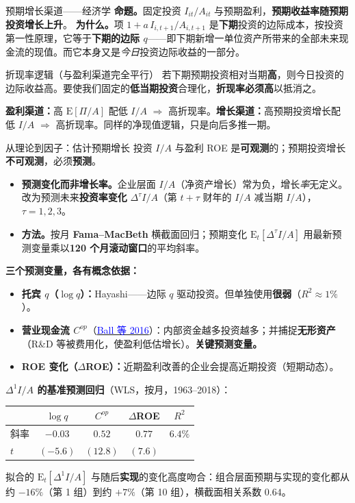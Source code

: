 \documentclass{beamer}
\begin{document}
\begin{frame}{预期增长渠道——经济学}
	\textbf{命题。}固定投资 $I_{it}/A_{it}$ 与预期盈利，\textbf{预期收益率随预期投资增长上升}。
	\vspace{3pt}
	\textbf{为什么。}项 $1+a\,I_{i,t+1}/A_{i,t+1}$ 是\textbf{下期}投资的边际成本，按投资第一性原理，它等于\textbf{下期的边际 $q$}——即下期新增一单位资产所带来的全部未来现金流的现值。而它本身又是\textit{今日}投资边际收益的一部分。
	\begin{block}{折现率逻辑（与盈利渠道完全平行）}
		若下期预期投资相对当期\textbf{高}，则今日投资的边际收益高。要使我们固定的\textbf{低当期投资}合理化，\textbf{折现率必须高}以抵消之。
	\end{block}
	{\footnotesize \textbf{盈利渠道：}高 $\mathrm{E}[\Pi/A]$ 配低 $I/A$ $\Rightarrow$ 高折现率。\quad \textbf{增长渠道：}高预期投资增长配低 $I/A$ $\Rightarrow$ 高折现率。同样的净现值逻辑，只是向后多推一期。}
\end{frame}

\begin{frame}[allowframebreaks]{从理论到因子：估计预期增长}
	投资 $I/A$ 与盈利 ROE 是\textbf{可观测}的；预期投资增长\textbf{不可观测}，必须\textbf{预测}。
	\begin{itemize}
		\item \textbf{预测变化而非增长率。}企业层面 $I/A$（净资产增长）常为负，增长\textit{率}无定义。改为预测未来\textbf{投资率变化} $\Delta^\tau I/A$（第 $t{+}\tau$ 财年的 $I/A$ 减当期 $I/A$），$\tau=1,2,3$。
		\item \textbf{方法。}按月 \textbf{Fama--MacBeth} 横截面回归；预期变化 $\mathrm{E}_t[\Delta^\tau I/A]$ 用最新预测变量乘以\textbf{120 个月滚动窗口}的平均斜率。
	\end{itemize}
	\textbf{三个预测变量，各有概念依据：}
	\begin{itemize}
		\item \textbf{托宾 $q$（$\log q$）：}Hayashi——边际 $q$ 驱动投资。但单独使用\textbf{很弱}（$R^2\approx1\%$）。
		\item \textbf{营业现金流 $C^{op}$}（\href{https://doi.org/10.1016/j.jfineco.2016.03.002}{\textcolor{blue}{Ball 等 2016}}）：内部资金越多投资越多；并捕捉\textbf{无形资产}（R\&D 等被费用化，使盈利低估增长）。\textbf{关键预测变量。}
		\item \textbf{ROE 变化（$\Delta$ROE）：}近期盈利改善的企业会提高近期投资（短期动态）。
	\end{itemize}
	\break
	\textbf{$\Delta^1 I/A$ 的基准预测回归}（WLS，按月，1963--2018）：
	\begin{center}
		\small
		\begin{tabular}{@{}lcccc@{}}
			\toprule
			& $\log q$ & $C^{op}$ & $\Delta$ROE & $R^2$ \\
			\midrule
			斜率 & $-0.03$ & $0.52$ & $0.77$ & $6.4\%$ \\
			$t$  & $(-5.6)$ & $(12.8)$ & $(7.6)$ & \\
			\bottomrule
		\end{tabular}
	\end{center}
	拟合的 $\mathrm{E}_t[\Delta^1 I/A]$ 与随后\textbf{实现}的变化高度吻合：组合层面预期与实现的变化都从约 $-16\%$（第 1 组）到约 $+7\%$（第 10 组），横截面相关系数 $0.64$。
\end{frame}
\end{document}
